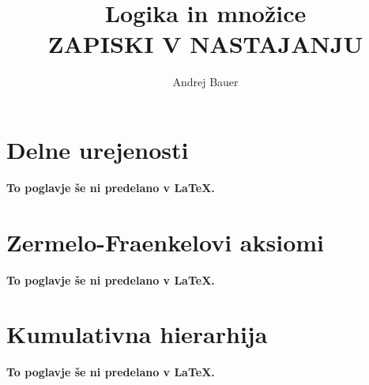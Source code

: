 \documentclass[11pt,a4paper]{book}
\author{Andrej Bauer}
\title{Logika in množice \\ ZAPISKI V NASTAJANJU}
\begin{document}
\maketitle

\cleardoublepage

\pagestyle{fancyplain}

{
\renewcommand{\markboth}[2]{}
\tableofcontents
}

\cleardoublepage
























\chapter{Delne urejenosti}
\textbf{To poglavje še ni predelano v {\LaTeX}.}
%





\chapter{Zermelo-Fraenkelovi aksiomi}
\textbf{To poglavje še ni predelano v {\LaTeX}.}
%

\chapter{Kumulativna hierarhija}
\textbf{To poglavje še ni predelano v {\LaTeX}.}
%


% 





{
\raggedright
\renewcommand{\markboth}[2]{}

}
\end{document}
